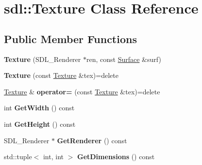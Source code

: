 \hypertarget{classsdl_1_1Texture}{\section{sdl\-:\-:Texture Class Reference}
\label{classsdl_1_1Texture}
}
\subsection*{Public Member Functions}
\begin{DoxyCompactItemize}
\item 
\hypertarget{classsdl_1_1Texture_aa611d232626f15699711bbd9f8621f97}{{\bfseries Texture} (S\-D\-L\-\_\-\-Renderer $\ast$ren, const \hyperlink{classsdl_1_1Surface}{Surface} \&surf)}\label{classsdl_1_1Texture_aa611d232626f15699711bbd9f8621f97}

\item 
\hypertarget{classsdl_1_1Texture_a9ef8fc4562712b6b4bc8e3b54bd7a66b}{{\bfseries Texture} (const \hyperlink{classsdl_1_1Texture}{Texture} \&tex)=delete}\label{classsdl_1_1Texture_a9ef8fc4562712b6b4bc8e3b54bd7a66b}

\item 
\hypertarget{classsdl_1_1Texture_a55c8e99d500b331a0ad4e5e97c1b2cfc}{\hyperlink{classsdl_1_1Texture}{Texture} \& {\bfseries operator=} (const \hyperlink{classsdl_1_1Texture}{Texture} \&tex)=delete}\label{classsdl_1_1Texture_a55c8e99d500b331a0ad4e5e97c1b2cfc}

\item 
\hypertarget{classsdl_1_1Texture_af59bd68b996858bde68cb5cbb08e30fe}{int {\bfseries Get\-Width} () const }\label{classsdl_1_1Texture_af59bd68b996858bde68cb5cbb08e30fe}

\item 
\hypertarget{classsdl_1_1Texture_a53a9ba9261c1f309d814a0a5af42a107}{int {\bfseries Get\-Height} () const }\label{classsdl_1_1Texture_a53a9ba9261c1f309d814a0a5af42a107}

\item 
\hypertarget{classsdl_1_1Texture_a0167d59afbd3ad3c11fa289285670ddf}{S\-D\-L\-\_\-\-Renderer $\ast$ {\bfseries Get\-Renderer} () const }\label{classsdl_1_1Texture_a0167d59afbd3ad3c11fa289285670ddf}

\item 
\hypertarget{classsdl_1_1Texture_a663838c830d3a473b0d5d8ccee18e000}{std\-::tuple$<$ int, int $>$ {\bfseries Get\-Dimensions} () const }\label{classsdl_1_1Texture_a663838c830d3a473b0d5d8ccee18e000}

\end{DoxyCompactItemize}
